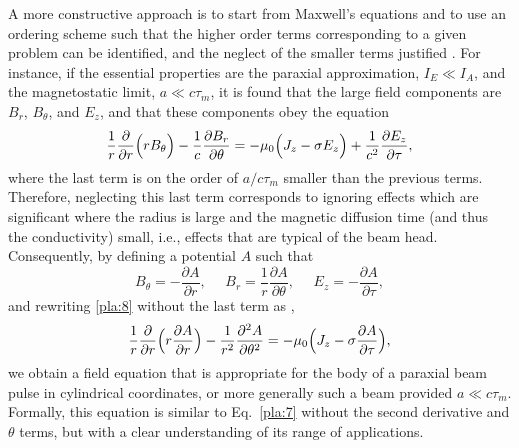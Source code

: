 \documentclass [12pt,a4paper,     ]{report} %
\begin{document}
   A more constructive approach is to start from Maxwell's equations and to use an ordering scheme such that the higher order terms corresponding to a given problem can be identified, and the neglect of the smaller terms justified \cite{LEE--1973E}.  For instance, if the essential properties are the paraxial approximation, $I_E \ll I_A$, and the magnetostatic limit, $a \ll c\tau_m$, it is found that the large field components are $B_r$, $B_\theta$, and $E_z$, and that these components obey the equation
%
\begin{equation}\label{pla:8} %
      \frac{1}{r} \frac{\partial    }{\partial      r} \Bigl( r B_\theta \Bigr)
    - \frac{1}{c} \frac{\partial B_r}{\partial \theta}
  = - \mu_0 \Bigl( J_z - \sigma E_z \Bigr)
    + \frac{1}{c^2} \frac{\partial E_z}{\partial \tau},
\end{equation}
%
where the last term is on the order of $a/c\tau_m$ smaller than the previous terms.  Therefore, neglecting this last term corresponds to ignoring effects which are significant where the radius is large and the magnetic diffusion time (and thus the conductivity) small, i.e., effects that are typical of the beam head.  Consequently, by defining a potential $A$ such that
%
\begin{equation}\label{pla:9} %
       B_\theta =             -\frac{\partial A}{\partial      r}, ~~~  ~~~
       B_r      =  \frac{1}{r} \frac{\partial A}{\partial \theta}, ~~~  ~~~
       E_z      =             -\frac{\partial A}{\partial   \tau},
\end{equation}
%
and rewriting \eqref{pla:8} without the last term as \cite{LEE--1973E}, \cite[p.8]{LEARY1972-}
%
\begin{equation}\label{pla:10} %
        \frac{1}{r} \frac{\partial    }{\partial r}
           \Bigl( r \frac{\partial   A}{\partial r} \Bigr)
     - \frac{1}{r^2}\frac{\partial^2 A}{\partial \theta^2}
     = - \mu_0 \Bigl( J_z - \sigma \frac{\partial A}{\partial \tau} \Bigr),
\end{equation}
%
we obtain a field equation that is appropriate for the body of a paraxial beam pulse in cylindrical coordinates, or more generally such a beam provided $a \ll c\tau_m$.  Formally, this equation is similar to Eq.~\eqref{pla:7} without the second derivative and $\theta$ terms, but with a clear understanding of its range of applications. 
\end{document}
